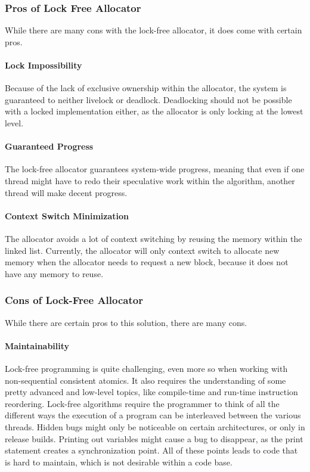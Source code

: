 \subsubsection{Pros of Lock Free Allocator}
While there are many cons with the lock-free allocator, it does come with certain pros.

\paragraph{Lock Impossibility}
Because of the lack of exclusive ownership within the allocator, the system is guaranteed to neither livelock or deadlock.
Deadlocking should not be possible with a locked implementation either, as the allocator is only locking at the lowest level.

\paragraph{Guaranteed Progress}
The lock-free allocator guarantees system-wide progress, meaning that even if one thread might have to redo their speculative work within the algorithm, another thread will make decent progress.

\paragraph{Context Switch Minimization}
The allocator avoids a lot of context switching by reusing the memory within the linked list.
Currently, the allocator will only context switch to allocate new memory when the allocator needs to request a new block,
because it does not have any memory to reuse.

\subsubsection{Cons of Lock-Free Allocator}
While there are certain pros to this solution, there are many cons.

\paragraph{Maintainability}
Lock-free programming is quite challenging, even more so when working with non-sequential consistent atomics.
It also requires the understanding of some pretty advanced and low-level topics, like compile-time and run-time instruction reordering.
Lock-free algorithms require the programmer to think of all the different ways the execution of a program can be interleaved between the various threads.
Hidden bugs might only be noticeable on certain architectures, or only in release builds.
Printing out variables might cause a bug to disappear, as the print statement creates a synchronization point.
All of these points leads to code that is hard to maintain, which is not desirable within a code base.

